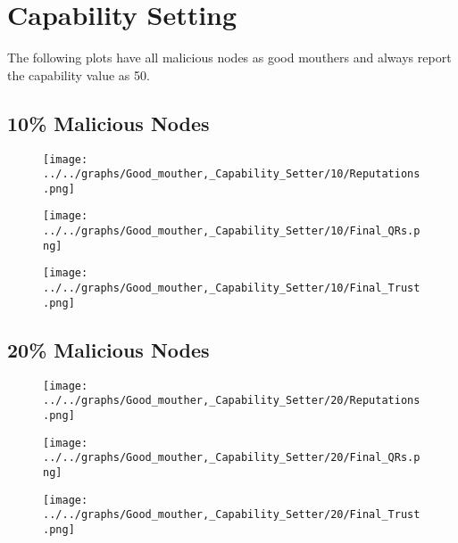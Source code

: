\section*{Capability Setting}
The following plots have all malicious nodes as good mouthers and always
report the capability value as 50.
\\
\begin{minipage}[t]{0.49\columnwidth}
\subsection*{10\% Malicious Nodes}
    \begin{figure}[H]
        \centering
        \texttt{[image: ../../graphs/Good\_mouther,\_Capability\_Setter/10/Reputations.png]}
    \end{figure}
    \begin{figure}[H]
        \centering
        \texttt{[image: ../../graphs/Good\_mouther,\_Capability\_Setter/10/Final\_QRs.png]}
    \end{figure}
\end{minipage}
\begin{minipage}[t]{0.49\columnwidth}
    \begin{figure}[H]
        \centering
        \texttt{[image: ../../graphs/Good\_mouther,\_Capability\_Setter/10/Final\_Trust.png]}
    \end{figure}
\end{minipage}

\begin{minipage}[t]{0.49\columnwidth}
\subsection*{20\% Malicious Nodes}
    \begin{figure}[H]
        \centering
        \texttt{[image: ../../graphs/Good\_mouther,\_Capability\_Setter/20/Reputations.png]}
    \end{figure}
    \begin{figure}[H]
        \centering
        \texttt{[image: ../../graphs/Good\_mouther,\_Capability\_Setter/20/Final\_QRs.png]}
    \end{figure}
\end{minipage}
\begin{minipage}[t]{0.49\columnwidth}
    \begin{figure}[H]
        \centering
        \texttt{[image: ../../graphs/Good\_mouther,\_Capability\_Setter/20/Final\_Trust.png]}
    \end{figure}
\end{minipage}

